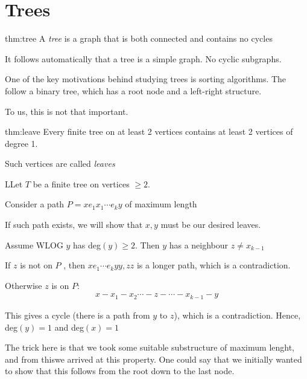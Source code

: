\section{Trees}
\par\bigskip
\begin{theo}[Tree]{thm:tree}
  A \textit{tree} is a graph that is both connected and contains no cycles
  \par\bigskip
  \noindent It follows automatically that a tree is a simple graph. No cyclic subgraphs. 
\end{theo}
\par\bigskip
\noindent One of the key motivations behind studying trees is sorting algorithms. The follow a binary tree, which has a root node and a left-right structure.\par
\noindent To us, this is not that important.
\par\bigskip
\begin{lem}[Leaves]{thm:leave}
  Every finite tree on at least 2 vertices contains at least 2 vertices of degree 1.
  \par\bigskip
  \noindent Such vertices are called \textit{leaves}
\end{lem}
\par\bigskip
\begin{prf}
  LLet $T$ be a finite tree on vertices $\geq2$.\par
  \noindent Consider a path $P = xe_1x_1\cdots e_ky$ of maximum length
  \par\bigskip
  \noindent If such path exists, we will show that $x,y$ must be our desired leaves.
  \par\bigskip
  \noindent Assume WLOG $y$ has deg$(y)\geq2$. Then $y$ has a neighbour $z\neq x_{k-1}$\par
  \noindent If $z$ is not on $P$ , then $xe_1\cdots e_ky{y,z}z$ is a longer path, which is a contradiction.
  \par\bigskip
  \noindent Otherwise $z$ is on $P$:
  \begin{equation*}
    \begin{gathered}
      x-x_1-x_2\cdots-z-\cdots-x_{k-1}-y
    \end{gathered}
  \end{equation*}\par
  \noindent This gives a cycle (there is a path from $y$ to $z$), which is a contradiction. Hence, deg$(y)=1$ and deg$(x)=1$
\end{prf}
\par\bigskip
\noindent The trick here is that we took some suitable substructure of maximum lenght, and from thiswe arrived at this property. One could say that we initially wanted to show that this follows from the root down to the last node.
